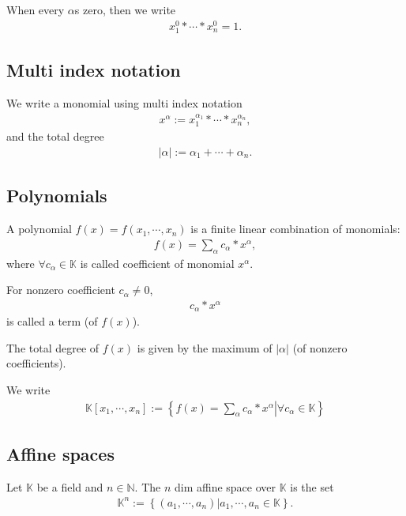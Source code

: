 \documentclass[11pt]{book}
\begin{document}
When every $\alpha$s zero, then we write
\begin{eqnarray}
x_1^{0} * \cdots * x_n^{0} = 1.
\end{eqnarray}

\subsection{Multi index notation}
We write a monomial using multi index notation
\begin{eqnarray}
x^\alpha := x_1^{\alpha_1} * \cdots * x_n^{\alpha_n},
\end{eqnarray}
and the total degree
\begin{eqnarray}
|\alpha| := \alpha_1+ \cdots + \alpha_n.
\end{eqnarray}

\subsection{Polynomials}
A polynomial $f(x) = f(x_1, \cdots, x_n)$ is a finite linear combination of monomials:
\begin{eqnarray}
f(x) = \sum_\alpha c_\alpha * x^\alpha,
\end{eqnarray}
where $\forall c_\alpha \in \mathbb{K}$ is called coefficient of monomial $x^\alpha$.

For nonzero coefficient $c_\alpha \neq 0$,
\begin{eqnarray}
c_\alpha * x^\alpha
\end{eqnarray}
is called a term (of $f(x)$).

The total degree of $f(x)$ is given by the maximum of $|\alpha|$ (of nonzero coefficients).

We write
\begin{eqnarray}
\label{polynomialRing}
\mathbb{K}[x_1,\cdots,x_n] := \left\{\left. f(x) = \sum_\alpha c_\alpha * x^\alpha \right| \forall c_\alpha \in \mathbb{K} \right\}
\end{eqnarray}

\subsection{Affine spaces}
Let $\mathbb{K}$ be a field and $n \in \mathbb{N}$.
The $n$ dim affine space over $\mathbb{K}$ is the set
\begin{eqnarray}
\mathbb{K}^n := \left\{ \left. (a_1, \cdots, a_n) \right| a_1, \cdots, a_n \in \mathbb{K} \right\}.
\end{eqnarray}
\end{document}
